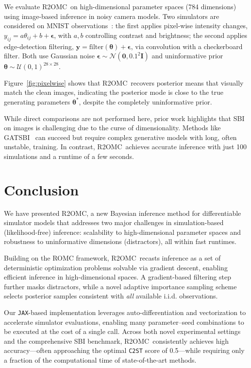 \documentclass[twoside]{article}
\newcommand{\thb}{\boldsymbol{\theta}}
\newcommand{\yb}{\mathbf{y}}
\newcommand{\rromc}{R2OMC}
\begin{document}
\vspace{-1ex}
We evaluate \rromc~on high-dimensional parameter spaces (784 dimensions) using image-based inference in noisy camera models.
Two simulators are considered on MNIST observations~\citep{lecun1998gradient}:
the first applies pixel-wise intensity changes, $y_{ij} = a\theta_{ij} + b + \boldsymbol{\epsilon}$,
with $a, b$ controlling contrast and brightness;
the second applies edge-detection filtering, $\yb = \text{filter}(\thb) + \boldsymbol{\epsilon}$,
via convolution with a checkerboard filter.
Both use Gaussian noise $\boldsymbol{\epsilon} \sim \mathcal{N}(\mathbf{0}, 0.1^2 \mathbf{I})$ and
uninformative prior $\thb \sim \mathcal{U}(0,1)^{28 \times 28}$.

Figure~\ref{fig:pixelwise} shows that \rromc~recovers posterior means that visually match the clean images, indicating the posterior mode is close to the true generating parameters
$\thb^*$, despite the completely uninformative prior.

While direct comparisons are not performed here, prior work highlights that SBI on images is challenging due to the curse of dimensionality. 
Methods like GATSBI~\citep{ramesh2022gatsbi} can succeed but require complex generative models with long, often unstable, training. 
In contrast, \rromc~achieves accurate inference with just 100 simulations and a runtime of a few seconds.
\vspace{-2ex}
\section{Conclusion}
\label{sec:conclusion}
\vspace{-1ex}
We have presented \rromc, a new Bayesian inference method for differentiable simulator models that addresses two major challenges in simulation-based (likelihood-free) inference:
scalability to high-dimensional parameter spaces and robustness to uninformative dimensions (distractors), all within fast runtimes.

Building on the ROMC framework, \rromc~recasts inference as a set of deterministic optimization problems solvable via gradient descent, enabling efficient inference in high-dimensional spaces. 
A gradient-based filtering step further masks distractors, while a novel adaptive importance sampling scheme selects posterior samples consistent with \emph{all} available i.i.d. observations.

Our \texttt{JAX}-based implementation leverages auto-differentiation and vectorization to accelerate simulator evaluations, enabling many parameter–seed combinations to be executed at the cost of a single call.
Across both novel experimental settings and the comprehensive SBI benchmark, \rromc~consistently achieves high accuracy—often approaching the optimal \texttt{C2ST} score of 0.5—while requiring only a fraction of the computational time of state-of-the-art methods.
\end{document}
